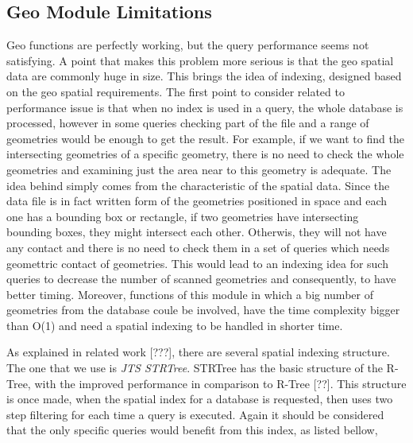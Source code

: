 \documentclass[a4paper,12pt]{article}
\begin{document}
\subsection{Geo Module Limitations}
Geo functions are perfectly working, but the query performance seems not satisfying. A point that makes this problem more serious is that the geo spatial data are commonly huge in size. This brings the idea of indexing, designed based on the geo spatial requirements.
The first point to consider related to performance issue is that when no index is used in a query, the whole database is processed, however in some queries checking part of the file and a range of geometries would be enough to get the result. For example, if we want to find the intersecting geometries of a specific geometry, there is no need to check the whole geometries and examining just the area near to this geometry is adequate. The idea behind simply comes from the characteristic of the spatial data. Since the data file is in fact written form of the geometries positioned in space and each one has a bounding box or rectangle, if two geometries have intersecting bounding boxes, they might intersect each other. Otherwis, they will not have any contact and there is no need to check them in a set of queries which needs geomettric contact of geometries.  
This would lead to an indexing idea for such queries to decrease the number of scanned geometries and consequently, to have better timing. Moreover, functions of this module in which a big number of geometries from the database coule be involved, have the time complexity bigger than O(1) and need a spatial indexing to be handled in shorter time. %


As explained in related work [???], there are several spatial indexing structure. The one that we use is \textit{JTS STRTree}. STRTree has the basic structure of the R-Tree, with the improved performance in comparison to R-Tree [??]. This structure is once made, when the spatial index for a database is requested, then uses two step filtering for each time a query is executed. Again it should be considered that the only specific queries would benefit from this index, as listed bellow,
\end{document}
